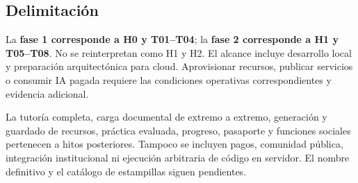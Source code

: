 \subsection{Delimitación}
La \textbf{fase 1 corresponde a H0 y T01--T04}; la \textbf{fase 2 corresponde a H1 y T05--T08}. No se reinterpretan como H1 y H2. El alcance incluye desarrollo local y preparación arquitectónica para cloud. Aprovisionar recursos, publicar servicios o consumir IA pagada requiere las condiciones operativas correspondientes y evidencia adicional.

La tutoría completa, carga documental de extremo a extremo, generación y guardado de recursos, práctica evaluada, progreso, pasaporte y funciones sociales pertenecen a hitos posteriores. Tampoco se incluyen pagos, comunidad pública, integración institucional ni ejecución arbitraria de código en servidor. El nombre definitivo y el catálogo de estampillas siguen pendientes.
